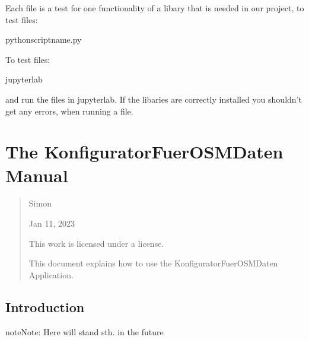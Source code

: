 \documentclass[letterpaper,10pt,english]{sphinxmanual}
\begin{document}
\sphinxAtStartPar
Each file is a test for one functionality of a libary that is needed in our project,
to test  files:

\begin{sphinxVerbatim}[commandchars=\\\{\}]
pythonscript\PYGZus{}name.py
\end{sphinxVerbatim}

\sphinxAtStartPar
To test  files:

\begin{sphinxVerbatim}[commandchars=\\\{\}]
jupyter\PYGZhy{}lab
\end{sphinxVerbatim}

\sphinxAtStartPar
and run the files in jupyter\sphinxhyphen{}lab. If the libaries are correctly installed you shouldn’t
get any errors, when running a file.

\sphinxstepscope


\section{The KonfiguratorFuerOSMDaten Manual}
\label{\detokenize{manual:the-konfiguratorfuerosmdaten-manual}}\label{\detokenize{manual:manual}}\label{\detokenize{manual::doc}}\begin{quote}\begin{description}
\sphinxAtStartPar
Simon


\sphinxAtStartPar
Jan 11, 2023

\sphinxAtStartPar
This work is licensed under a  license.

\sphinxAtStartPar
This document explains how to use the KonfiguratorFuerOSMDaten Application.

\end{description}\end{quote}


\subsection{Introduction}
\label{\detokenize{manual:introduction}}\label{\detokenize{manual:intro}}
\begin{sphinxadmonition}{note}{Note:}
\sphinxAtStartPar
Here will stand sth. in the future
\end{sphinxadmonition}
\end{document}
